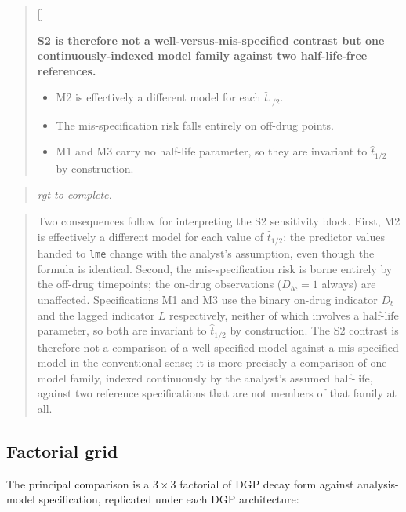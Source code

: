 \documentclass[
  11pt,
]{article}
\newcounter{pgraph}
\newenvironment{bullets}{%
  \stepcounter{pgraph}%
  \begin{quote}\small\sffamily\color[gray]{0.30}%
  {\normalfont\scriptsize\color[gray]{0.58}[\thepgraph]\enspace}}{%
  \end{quote}}
\newenvironment{rgt}{%
  \begin{quote}\small\itshape\color[RGB]{20,60,160}}{%
  \end{quote}}
\newenvironment{orig}{%
  \begin{quote}\normalsize\color[gray]{0.55}}{%
  \end{quote}}
\begin{document}
\begin{bullets}

\textbf{S2 is therefore not a well-versus-mis-specified contrast
but one continuously-indexed model family against two half-life-free
references.}

\begin{itemize}\setlength{\itemsep}{2pt}\setlength{\parskip}{0pt}
\item M2 is effectively a different model for each $\hat{t}_{1/2}$.
\item The mis-specification risk falls entirely on off-drug points.
\item M1 and M3 carry no half-life parameter, so they are invariant
to $\hat{t}_{1/2}$ by construction.
\end{itemize}

\end{bullets}

\begin{rgt}
rgt to complete.

\end{rgt}

\begin{orig}
Two consequences follow for interpreting the S2 sensitivity
block. First, M2 is effectively a different model for each value
of \(\hat{t}_{1/2}\): the predictor values handed to \texttt{lme} change
with the analyst's assumption, even though the formula is
identical. Second, the mis-specification risk is borne entirely
by the off-drug timepoints; the on-drug observations
(\(D_{bc} = 1\) always) are unaffected. Specifications M1 and M3
use the binary on-drug indicator \(D_b\) and the lagged indicator
\(L\) respectively, neither of which involves a half-life
parameter, so both are invariant to \(\hat{t}_{1/2}\) by
construction. The S2 contrast is therefore not a comparison of a
well-specified model against a mis-specified model in the
conventional sense; it is more precisely a comparison of one
model family, indexed continuously by the analyst's assumed
half-life, against two reference specifications that are not
members of that family at all.

\end{orig}

\subsection{Factorial grid}\label{factorial-grid}

The principal comparison is a \(3 \times 3\) factorial of DGP
decay form against analysis-model specification, replicated
under each DGP architecture:
\end{document}
